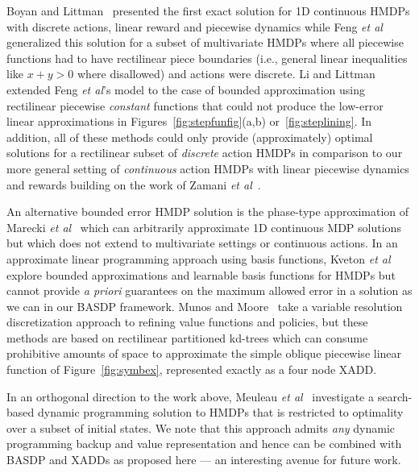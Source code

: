 Boyan and Littman~\cite{boyan01} presented the first exact solution
for 1D continuous HMDPs with discrete actions, linear reward and
piecewise dynamics while Feng {\it et al}~\cite{feng04} generalized
this solution for a subset of multivariate HMDPs where all piecewise
functions had to have rectilinear piece boundaries (i.e., general
linear inequalities like $x + y > 0$ where disallowed) and actions
were discrete.  Li and Littman~\cite{li05} extended Feng {\it et al}'s
model to the case of bounded approximation using rectilinear piecewise
\emph{constant} functions that %
 could not produce
the low-error linear approximations in Figures~\ref{fig:stepfunfig}(a,b)
or~\ref{fig:steplining}.  In addition,  all of these methods
could only provide (approximately) optimal solutions for a rectilinear
subset of \emph{discrete} action HMDPs in comparison to our
more general setting of \emph{continuous} action HMDPs with 
linear piecewise dynamics and rewards building on the work of Zamani
{\it et al}~\cite{zamani12}.  

An alternative bounded error HMDP solution is the phase-type
approximation of Marecki {\it et al}~\cite{phase07} which can
arbitrarily approximate 1D continuous MDP solutions but which does not
extend to multivariate settings or continuous actions.
In an approximate linear programming approach using basis functions, 
Kveton {\it et al}~\cite{kveton06,kveton06aaai} explore bounded
approximations and learnable basis functions for HMDPs but cannot provide 
\emph{a priori} guarantees on the maximum allowed error in a solution
as we can in our BASDP framework.  Munos and Moore~\cite{munos02} take
a variable resolution discretization approach to refining value
functions and policies, but these methods are based on rectilinear
partitioned kd-trees which can consume
prohibitive amounts of space to approximate the simple oblique
piecewise linear function of Figure~\ref{fig:symbex}, 
represented exactly as a four node XADD.

In an orthogonal direction to the work above, Meuleau {\it et
al}~\cite{hao09} investigate a search-based dynamic programming
solution to HMDPs that is restricted to optimality over a subset of
initial states.  We note that this approach admits \emph{any} dynamic
programming backup and value representation and hence can be combined with
BASDP and XADDs as proposed here --- an interesting avenue for future
work.

